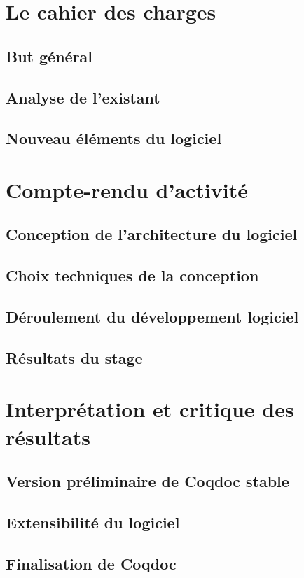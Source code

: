 \documentclass[a4paper, 11pt]{report}
\begin{document}
  \section{Le cahier des charges}
    \subsection{But général}
    \subsection{Analyse de l'existant}
    \subsection{Nouveau éléments du logiciel}
  \section{Compte-rendu d'activité}
    \subsection{Conception de l'architecture du logiciel}
    \subsection{Choix techniques de la conception}
    \subsection{Déroulement du développement logiciel}
    \subsection{Résultats du stage}
  \section{Interprétation et critique des résultats}
    \subsection{Version préliminaire de Coqdoc stable}
    \subsection{Extensibilité du logiciel}
    \subsection{Finalisation de Coqdoc}
\end{document}

